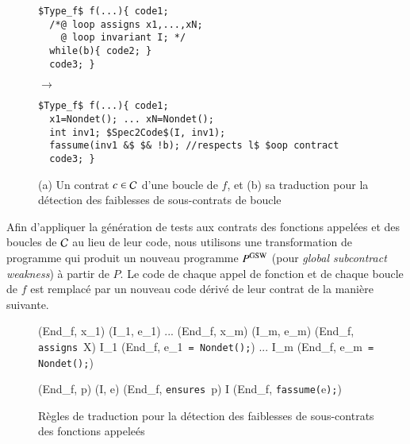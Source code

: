 \begin{figure*}[tb]
\begin{center}
\begin{minipage}{0.35\columnwidth}
\begin{lstlisting}[mathescape]
$Type_f$ f(...){ code1;
  /*@ loop assigns x1,...,xN;
    @ loop invariant I; */
  while(b){ code2; }
  code3; }
\end{lstlisting}
\end{minipage}
\hspace{-6mm}
\begin{minipage}{0.07\columnwidth}$\to$\end{minipage}
\begin{minipage}{0.55\columnwidth}
\begin{lstlisting}[mathescape]
$Type_f$ f(...){ code1;
  x1=Nondet(); ... xN=Nondet();
  int inv1; $Spec2Code$(I, inv1);
  fassume(inv1 &$ $& !b); //respects l$ $oop contract
  code3; }
\end{lstlisting}
\end{minipage}
\vspace{-3mm}
\caption{(a) Un contrat $c\in{\ensuremath\mathcal{C}}$ d'une boucle de $f$, et
(b) sa traduction pour la détection des faiblesses de sous-contrats de boucle}
\vspace{-3mm}
\label{fig:CW-transf-loops}
\end{center}
\end{figure*}

Afin d'appliquer la génération de tests aux contrats des fonctions appelées et
des boucles de ${\mathcal{C}}$ au lieu de leur code, nous utilisons une transformation de
programme qui produit un nouveau programme $P^{\mathrm{GSW}}$ (pour {\em global
subcontract weakness}) à partir de $P$.
Le code de chaque appel de fonction et de chaque boucle de $f$ est remplacé
par un nouveau code dérivé de leur contrat de la manière suivante.

\begin{figure}[tb]
  \scriptsize{
    {
      {
        (End_f, x_1) \trule (I_1, e_1) \quad
        ... \quad
        (End_f, x_m) \trule (I_m, e_m)
      }
      {
        (End_f, \mbox{\lstinline'assigns'}~X\semicolon) \arule
        I_1 \concat (End_f, e_1~\mbox{\lstinline'= Nondet();'})
        \concat ...
        \concat I_m \concat (End_f, e_m~\mbox{\lstinline'= Nondet();'})
      }{}
    }

    {
      {(End_f, p) \prule (I, e)}
      {(End_f, \mbox{\lstinline'ensures'}~p\semicolon)
        \arule
        I \concat (End_f, \mbox{\lstinline'fassume('}e\mbox{\lstinline');'})}{}
    }
  }
  \caption{Règles de traduction pour la détection des faiblesses de
    sous-contrats des fonctions appeleés}
  \label{fig:assume-annot}
\end{figure}

